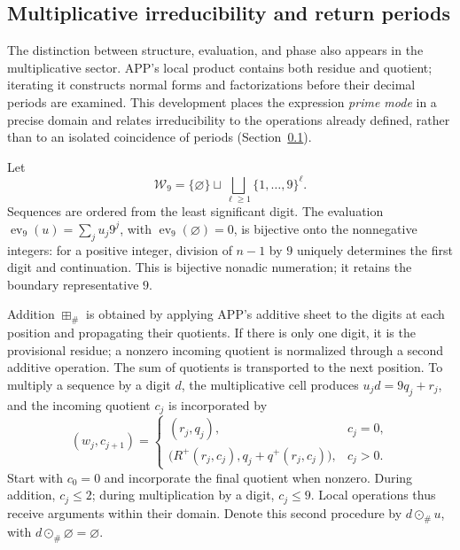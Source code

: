 \subsection{Multiplicative irreducibility and return periods}
\label{primos-retornos}

The distinction between structure, evaluation, and phase also appears in
the multiplicative sector. APP's local product contains both residue and
quotient; iterating it constructs normal forms and factorizations before
their decimal periods are examined. This development places the expression
\emph{prime mode} in a precise domain and relates irreducibility to the
operations already defined, rather than to an isolated coincidence
of periods (Section~\ref{primos-retornos}).

Let
\[
 \mathcal W_9=\{\varnothing\}\sqcup
 \bigsqcup_{\ell\geq1}\{1,\ldots,9\}^{\ell}.
\]
Sequences are ordered from the least significant digit. The evaluation
\(\operatorname{ev}_9(u)=\sum_j u_j9^j\), with
\(\operatorname{ev}_9(\varnothing)=0\), is bijective onto the nonnegative
integers: for a positive integer, division of \(n-1\) by \(9\)
uniquely determines the first digit and continuation. This is bijective
nonadic numeration; it retains the boundary representative \(9\).

Addition \(\boxplus_\#\) is obtained by applying APP's additive sheet
to the digits at each position and propagating their quotients. If there
is only one digit, it is the provisional residue; a nonzero incoming
quotient is normalized through a second additive operation. The sum of
quotients is transported to the next position. To multiply a sequence by
a digit \(d\), the multiplicative cell produces
\(u_jd=9q_j+r_j\), and the incoming quotient \(c_j\) is incorporated by
\[
 (w_j,c_{j+1})=
 \begin{cases}
 (r_j,q_j),&c_j=0,\\
 \bigl(R^+(r_j,c_j),q_j+q^+(r_j,c_j)\bigr),&c_j>0.
 \end{cases}
\]
Start with \(c_0=0\) and incorporate the final quotient when nonzero.
During addition, \(c_j\leq2\); during multiplication by a digit,
\(c_j\leq9\). Local operations thus receive arguments within
their domain. Denote this second procedure by \(d\odot_\#u\),
with \(d\odot_\#\varnothing=\varnothing\).

